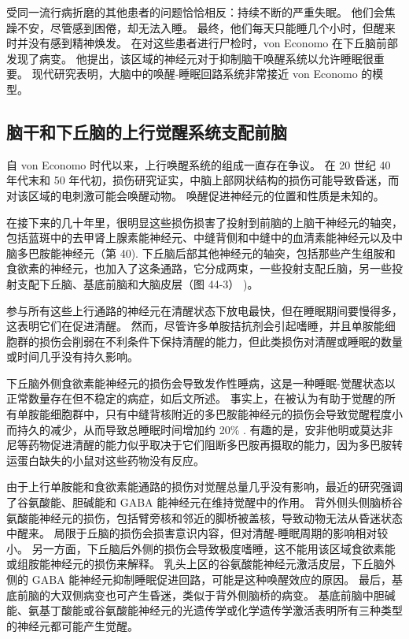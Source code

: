 受同一流行病折磨的其他患者的问题恰恰相反：持续不断的严重失眠。 他们会焦躁不安，尽管感到困倦，却无法入睡。 最终，他们每天只能睡几个小时，但醒来时并没有感到精神焕发。 在对这些患者进行尸检时，von Economo 在下丘脑前部发现了病变。 他提出，该区域的神经元对于抑制脑干唤醒系统以允许睡眠很重要。 现代研究表明，大脑中的唤醒-睡眠回路系统非常接近 von Economo 的模型。



\subsection{脑干和下丘脑的上行觉醒系统支配前脑}
自 von Economo 时代以来，上行唤醒系统的组成一直存在争议。 在 20 世纪 40 年代末和 50 年代初，损伤研究证实，中脑上部网状结构的损伤可能导致昏迷，而对该区域的电刺激可能会唤醒动物。 唤醒促进神经元的位置和性质是未知的。

在接下来的几十年里，很明显这些损伤损害了投射到前脑的上脑干神经元的轴突，包括蓝斑中的去甲肾上腺素能神经元、中缝背侧和中缝中的血清素能神经元以及中脑多巴胺能神经元（第 40). 下丘脑后部其他神经元的轴突，包括那些产生组胺和食欲素的神经元，也加入了这条通路，它分成两束，一些投射支配丘脑，另一些投射支配下丘脑、基底前脑和大脑皮层（图 44-3） )。

参与所有这些上行通路的神经元在清醒状态下放电最快，但在睡眠期间要慢得多，这表明它们在促进清醒。 然而，尽管许多单胺拮抗剂会引起嗜睡，并且单胺能细胞群的损伤会削弱在不利条件下保持清醒的能力，但此类损伤对清醒或睡眠的数量或时间几乎没有持久影响。

下丘脑外侧食欲素能神经元的损伤会导致发作性睡病，这是一种睡眠-觉醒状态以正常数量存在但不稳定的病症，如后文所述。 事实上，在被认为有助于觉醒的所有单胺能细胞群中，只有中缝背核附近的多巴胺能神经元的损伤会导致觉醒程度小而持久的减少，从而导致总睡眠时间增加约 20\% . 有趣的是，安非他明或莫达非尼等药物促进清醒的能力似乎取决于它们阻断多巴胺再摄取的能力，因为多巴胺转运蛋白缺失的小鼠对这些药物没有反应。

由于上行单胺能和食欲素能通路的损伤对觉醒总量几乎没有影响，最近的研究强调了谷氨酸能、胆碱能和 GABA 能神经元在维持觉醒中的作用。 背外侧头侧脑桥谷氨酸能神经元的损伤，包括臂旁核和邻近的脚桥被盖核，导致动物无法从昏迷状态中醒来。 局限于丘脑的损伤会损害意识内容，但对清醒-睡眠周期的影响相对较小。 另一方面，下丘脑后外侧的损伤会导致极度嗜睡，这不能用该区域食欲素能或组胺能神经元的损伤来解释。 乳头上区的谷氨酸能神经元激活皮层，下丘脑外侧的 GABA 能神经元抑制睡眠促进回路，可能是这种唤醒效应的原因。 最后，基底前脑的大双侧病变也可产生昏迷，类似于背外侧脑桥的病变。 基底前脑中胆碱能、氨基丁酸能或谷氨酸能神经元的光遗传学或化学遗传学激活表明所有三种类型的神经元都可能产生觉醒。

